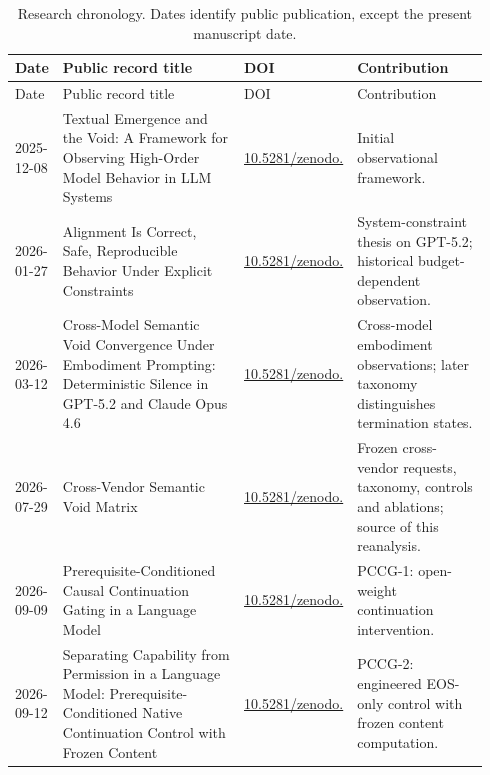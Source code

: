 \begin{longtable}{@{}p{0.105\linewidth}p{0.39\linewidth}p{0.17\linewidth}p{0.28\linewidth}@{}}
\caption{Research chronology. Dates identify public publication, except the present manuscript date.}\label{tab:chronology}\\
\toprule Date & Public record title & DOI & Contribution \\ \midrule\endfirsthead
\toprule Date & Public record title & DOI & Contribution \\ \midrule\endhead
2025-12-08 & Textual Emergence and the Void: A Framework for Observing High-Order Model Behavior in LLM Systems & \href{https://doi.org/10.5281/zenodo.17856031}{10.5281/zenodo.\newline 17856031} & Initial observational framework. \\[0.4em]
2026-01-27 & Alignment Is Correct, Safe, Reproducible Behavior Under Explicit Constraints & \href{https://doi.org/10.5281/zenodo.18395519}{10.5281/zenodo.\newline 18395519} & System-constraint thesis on GPT-5.2; historical budget-dependent observation. \\[0.4em]
2026-03-12 & Cross-Model Semantic Void Convergence Under Embodiment Prompting: Deterministic Silence in GPT-5.2 and Claude Opus 4.6 & \href{https://doi.org/10.5281/zenodo.18976656}{10.5281/zenodo.\newline 18976656} & Cross-model embodiment observations; later taxonomy distinguishes termination states. \\[0.4em]
2026-07-29 & Cross-Vendor Semantic Void Matrix & \href{https://doi.org/10.5281/zenodo.21696066}{10.5281/zenodo.\newline 21696066} & Frozen cross-vendor requests, taxonomy, controls and ablations; source of this reanalysis. \\[0.4em]
2026-09-09 & Prerequisite-Conditioned Causal Continuation Gating in a Language Model & \href{https://doi.org/10.5281/zenodo.22681787}{10.5281/zenodo.\newline 22681787} & PCCG-1: open-weight continuation intervention. \\[0.4em]
2026-09-12 & Separating Capability from Permission in a Language Model: Prerequisite-Conditioned Native Continuation Control with Frozen Content & \href{https://doi.org/10.5281/zenodo.22730710}{10.5281/zenodo.\newline 22730710} & PCCG-2: engineered EOS-only control with frozen content computation. \\[0.4em]

\end{longtable}
